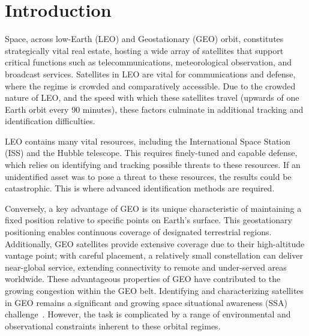\documentclass[12pt]{elsarticle}
\begin{document}


\section{Introduction}
Space, across low-Earth (LEO) and Geostationary (GEO) orbit, constitutes strategically vital real estate, hosting a wide array of satellites that support critical functions such as telecommunications, meteorological observation, and broadcast services. Satellites in LEO are vital for communications and defense, where the regime is crowded and comparatively accessible. Due to the crowded nature of LEO, and the speed with which these satellites travel (upwards of one Earth orbit every 90 minutes), these factors culminate in additional tracking and identification difficulties.

LEO contains many vital resources, including the International Space Station (ISS) and the Hubble telescope. This requires finely-tuned and capable defense, which relies on identifying and tracking possible threats to these resources. If an unidentified asset was to pose a threat to these resources, the results could be catastrophic. This is where advanced identification methods are required.

Conversely, a key advantage of GEO is its unique characteristic of maintaining a fixed position relative to specific points on Earth's surface. This geostationary positioning enables continuous coverage of designated terrestrial regions. Additionally, GEO satellites provide extensive coverage due to their high-altitude vantage point; with careful placement, a relatively small constellation can deliver near-global service, extending connectivity to remote and under-served areas worldwide. These advantageous properties of GEO have contributed to the growing congestion within the GEO belt. Identifying and characterizing satellites in GEO remains a significant and growing space situational awareness (SSA) challenge~\cite{xu2019algorithms, siddique2024detection}.  However, the task is complicated by a range of environmental and observational constraints inherent to these orbital regimes.
\end{document}
